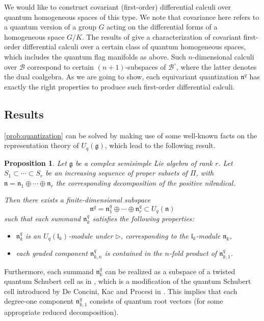 \documentclass[a4paper, 12pt, reqno, english]{amsart}
\numberwithin{equation}{section}
\numberwithin{figure}{section}
\theoremstyle{plain}
\theoremstyle{plain}
\theoremstyle{plain}
\newtheorem{proposition}[theorem]{Proposition}
\theoremstyle{plain}
\theoremstyle{plain}
\theoremstyle{definition}
\theoremstyle{definition}
\theoremstyle{definition}
\theoremstyle{remark}
\theoremstyle{definition}
\theoremstyle{definition}
\newcommand{\Uqg}{U_q(\mathfrak{g})}
\newcommand{\Uqn}{U_q(\mathfrak{n})}
\newcommand{\lieg}{\mathfrak{g}}
\newcommand{\liel}{\mathfrak{l}}
\newcommand{\lien}{\mathfrak{n}}
\newcommand{\calB}{\mathcal{B}}
\newcommand{\simpleroots}{\Pi}
\newcommand{\qnil}{\lien^q}
\begin{document}
We would like to construct covariant (first-order) differential calculi over quantum homogeneous spaces of this type.
We note that covariance here refers to a quantum version of a group $G$ acting on the differential forms of a homogeneous space $G / K$.
The results of \cite{heko-homogeneous} give a characterization of covariant first-order differential calculi over a certain class of quantum homogeneous spaces, which includes the quantum flag manifolds as above.
Such $n$-dimensional calculi over $\calB$ correspond to certain $(n + 1)$-subspaces of $\calB^\circ$, where the latter denotes the dual coalgebra.
As we are going to show, each equivariant quantization $\qnil$ has exactly the right properties to produce such first-order differential calculi.

\subsection{Results}

\cref{prob:quantization} can be solved by making use of some well-known facts on the representation theory of $\Uqg$, which lead to the following result.

\begin{proposition}
\label{prop:intro-quantization}
Let $\lieg$ be a complex semisimple Lie algebra of rank $r$.
Let $S_1 \subset \cdots \subset S_r$ be an increasing sequence of proper subsets of $\simpleroots$, with $\lien = \lien_1 \oplus \cdots \oplus \lien_r$ the corresponding decomposition of the positive nilradical.

Then there exists a finite-dimensional subspace
\[
\qnil = \qnil_1 \oplus \cdots \oplus \qnil_r \subset \Uqn
\]
such that each summand $\qnil_k$ satisfies the following properties:
\begin{itemize}
\item $\qnil_k$ is an $U_q(\liel_k)$-module under $\triangleright$, corresponding to the $\liel_k$-module $\lien_k$,
\item each graded component $\qnil_{k, n}$ is contained in the $n$-fold product of $\qnil_{k, 1}$.
\end{itemize}
\end{proposition}

Furthermore, each summand $\qnil_k$ can be realized as a subspace of a twisted quantum Schubert cell as in \cite{zwicknagl}, which is a modification of the quantum Schubert cell introduced by De Concini, Kac and Procesi in \cite{dckp}.
This implies that each degree-one component $\qnil_{k, 1}$ consists of quantum root vectors (for some appropriate reduced decomposition).
\end{document}
